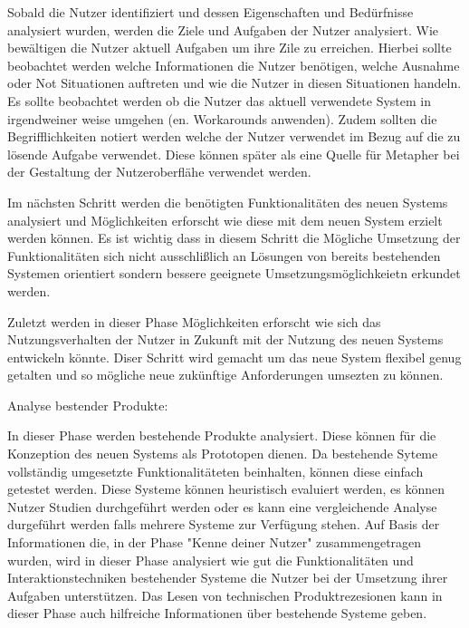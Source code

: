Sobald die Nutzer identifiziert und dessen Eigenschaften und Bedürfnisse analysiert wurden, werden die Ziele und Aufgaben der Nutzer analysiert. 
Wie bewältigen die  Nutzer  aktuell Aufgaben um ihre Zile zu erreichen. Hierbei sollte beobachtet werden welche Informationen die Nutzer benötigen, welche Ausnahme oder Not Situationen  
auftreten und wie die Nutzer in diesen Situationen handeln. Es sollte beobachtet werden ob die Nutzer das aktuell verwendete System in irgendweiner  weise umgehen (en. Workarounds anwenden). 
Zudem sollten die Begrifflichkeiten notiert werden welche der Nutzer verwendet im Bezug auf die zu lösende Aufgabe verwendet.  Diese können später als eine Quelle für Metapher bei der Gestaltung 
der Nutzeroberflähe verwendet werden. 


Im nächsten Schritt werden die benötigten Funktionalitäten des neuen Systems analysiert und Möglichkeiten erforscht wie diese mit dem neuen System erzielt werden können. 
Es ist wichtig dass in diesem Schritt die Mögliche Umsetzung der Funktionalitäten sich nicht ausschlißlich an Lösungen von bereits bestehenden Systemen orientiert sondern 
bessere geeignete Umsetzungsmöglichkeietn erkundet werden.

Zuletzt werden in dieser Phase Möglichkeiten erforscht wie sich das Nutzungsverhalten der Nutzer in Zukunft mit der Nutzung des neuen Systems entwickeln könnte. Diser Schritt wird  
gemacht um das neue System flexibel genug getalten und so mögliche neue zukünftige Anforderungen umsezten zu können.

Analyse bestender Produkte: 

In dieser Phase werden bestehende Produkte analysiert. Diese können für die Konzeption des neuen Systems als Prototopen dienen. Da bestehende Syteme vollständig 
umgesetzte Funktionalitäteten beinhalten, können diese einfach getestet werden.    
Diese Systeme können heuristisch evaluiert werden, es können Nutzer Studien durchgeführt werden oder es kann eine vergleichende Analyse durgeführt werden falls mehrere Systeme zur 
Verfügung stehen. Auf Basis der Informationen die, in der Phase "Kenne deiner Nutzer" zusammengetragen wurden, wird in dieser Phase analysiert wie gut die  Funktionalitäten und Interaktionstechniken 
bestehender Systeme die Nutzer bei der Umsetzung ihrer Aufgaben unterstützen. Das Lesen von technischen Produktrezesionen kann in dieser Phase auch hilfreiche Informationen über bestehende Systeme geben. 

